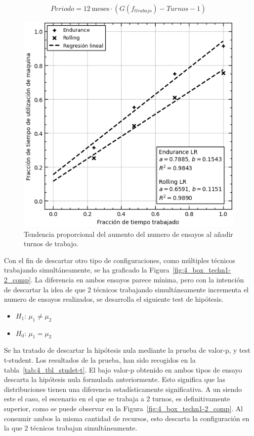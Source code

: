 \begin{equation}
	Periodo = 12~\text{meses} \cdot (G(f_{t trabajo}) - Turnos -1)
	\label{eq:period}
\end{equation}

\begin{figure}
	\begin{center}
		\includegraphics{fig/4_sctr_time_sat}
	\end{center}
	\caption{Tendencia proporcional del aumento del numero de ensayos al añadir turnos de trabajo.}
	\label{fig:4_sctr_time_sat}
\end{figure}

Con el fin de descartar otro tipo de configuraciones,
como múltiples técnicos trabajando simultáneamente,
se ha graficado la Figura~\ref{fig:4_box_techn1-2_comp}.
La diferencia en ambos ensayos parece mínima,
pero con la intención de descartar la idea de que
2 técnicos trabajando simultáneamente incrementa el numero de ensayos realizados,
se desarrolla el siguiente test de hipótesis.

\begin{itemize}
	\item $H_1$: $\mu_1 \neq \mu_2$
	\item $H_0$: $\mu_1 = \mu_2$
\end{itemize}

Se ha tratado de descartar la hipótesis nula mediante la prueba de valor-p,
y test t-student.
Los resultados de la prueba,
han sido recogidos en la tabla~\ref{tab:4_tbl_studet-t}.
El bajo valor-p obtenido en ambos tipos de ensayo
descarta la hipótesis nula formulada anteriormente.
Esto significa que las distribuciones
tienen una diferencia estadísticamente significativa.
A un siendo este el caso,
el escenario en el que se trabaja a 2 turnos,
es definitivamente superior,
como se puede observar en la Figura~\ref{fig:4_box_techn1-2_comp}.
Al consumir ambos la misma cantidad de recursos,
esto descarta la configuración en la que 2 técnicos trabajan simultáneamente.

